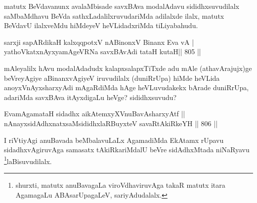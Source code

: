 \begin{artha}
matutx BeVdavanunx avalaMbisade savxBAva modalAdavu sididhxsuvudilalx saMbaMdhavu BeVda sathxLadalilxruvudariMda adilalxde ilalx, matutx BeVdavU ilalxveMdu hiMdeyeV heVLidadxriMda tiLiyabahudu.
\end{artha}


\begin{shl}
sarxji sapARdikaH kalxqqpotxV nABinonxV Binanx Eva vA | \\
yathoVkatxnAyxyamAgeVRNa \footnotemark[2]savxBAvAdi tataH kutaH\hfill ||  805 ||  
\end{shl}

\begin{artha}
mAleyalilx hAvu modalAdadudx kalapxsalapxTiTxde adu mAle (athavArajujx)ge beVreyAgiye aBinanxvAgiyeV iruvudilalx (duniRrUpa) hiMde heVLida anoyxVnAyxsharxyAdi mAgaRdiMda hAge heVLuvudakekx bArade duniRrUpa, adariMda savxBAva itAyxdigaLu heVge? sididhxsuvudu?
\end{artha}


\begin{shl}
EvamAgamataH sidadhx aikAtemxyXV\s nuBavAsharxyAtf ||  \\
nAnayxsidAdhxnatxsaMsididhxlaRBuyxteV savaRtAkiRkeYH \hfill||  806 ||  
\end{shl}

\begin{artha}
I riVtiyAgi anuBavada beMbalavuLaLx AgamadiMda EkAtamx rUpavu sidadhxvAgiruvAga samasatx tAkiRkariMdalU beVre sidAdhxMtada niNaRyavu \footnote[1]{shurxti, matutx anuBavagaLa viroVdhaviruvAga takaR matutx itara AgamagaLu ABAsarUpagaLeV, sariyAdudalalx.
}laBisuvudilalx.
\end{artha}


